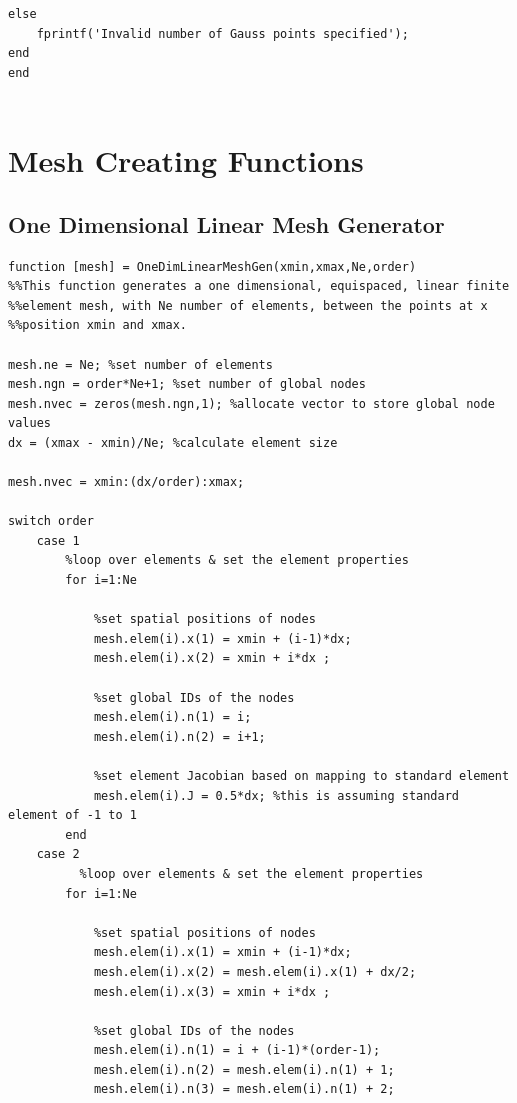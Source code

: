 \documentclass[11pt]{article}
\begin{document}
\begin{appendices}
\begin{lstlisting}
else
    fprintf('Invalid number of Gauss points specified');
end
end


\end{lstlisting}
\pagebreak

\section{Mesh Creating Functions}
\subsection{One Dimensional Linear Mesh Generator}\label{ap:Mesh1}

\begin{lstlisting}
function [mesh] = OneDimLinearMeshGen(xmin,xmax,Ne,order)
%%This function generates a one dimensional, equispaced, linear finite
%%element mesh, with Ne number of elements, between the points at x
%%position xmin and xmax.

mesh.ne = Ne; %set number of elements
mesh.ngn = order*Ne+1; %set number of global nodes
mesh.nvec = zeros(mesh.ngn,1); %allocate vector to store global node values
dx = (xmax - xmin)/Ne; %calculate element size

mesh.nvec = xmin:(dx/order):xmax;

switch order
    case 1 
        %loop over elements & set the element properties
        for i=1:Ne
            
            %set spatial positions of nodes
            mesh.elem(i).x(1) = xmin + (i-1)*dx;
            mesh.elem(i).x(2) = xmin + i*dx ;
            
            %set global IDs of the nodes
            mesh.elem(i).n(1) = i;
            mesh.elem(i).n(2) = i+1;
            
            %set element Jacobian based on mapping to standard element
            mesh.elem(i).J = 0.5*dx; %this is assuming standard element of -1 to 1 
        end
    case 2
          %loop over elements & set the element properties
        for i=1:Ne
            
            %set spatial positions of nodes
            mesh.elem(i).x(1) = xmin + (i-1)*dx;
            mesh.elem(i).x(2) = mesh.elem(i).x(1) + dx/2; 
            mesh.elem(i).x(3) = xmin + i*dx ;
            
            %set global IDs of the nodes
            mesh.elem(i).n(1) = i + (i-1)*(order-1);
            mesh.elem(i).n(2) = mesh.elem(i).n(1) + 1;
            mesh.elem(i).n(3) = mesh.elem(i).n(1) + 2;
            

\end{lstlisting}
\end{appendices}
\end{document}
